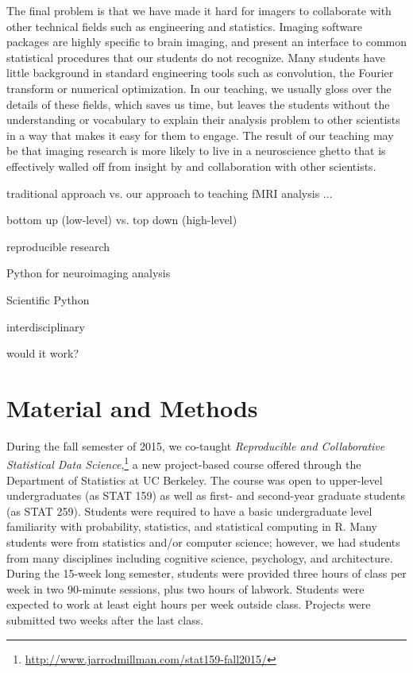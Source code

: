 The final problem is that we have made it hard for imagers to collaborate with
other technical fields such as engineering and statistics.  Imaging software
packages are highly specific to brain imaging, and present an interface to
common statistical procedures that our students do not recognize.  Many
students have little background in standard engineering tools such as
convolution, the Fourier transform or numerical optimization.  In our
teaching, we usually gloss over the details of these fields, which saves us
time, but leaves the students without the understanding or vocabulary to
explain their analysis problem to other scientists in a way that makes it easy
for them to engage.  The result of our teaching may be that imaging research
is more likely to live in a neuroscience ghetto that is effectively walled off
from insight by and collaboration with other scientists.


traditional approach vs. our approach to teaching fMRI analysis ...

bottom up (low-level) vs. top down (high-level)

reproducible research \citep{millman2014developing}

Python for neuroimaging analysis \citep{millman2007analysis}

Scientific Python \citep{millman2011python}

interdisciplinary

would it work?

\section{Material and Methods}

During the fall semester of 2015, we co-taught \emph{Reproducible and Collaborative
Statistical Data Science},\footnote{\url{http://www.jarrodmillman.com/stat159-fall2015/}}
a new project-based course offered through the Department of Statistics at UC Berkeley.
The course was open to upper-level undergraduates (as STAT 159) as well as
first- and second-year graduate students (as STAT 259).
Students were required to have a basic undergraduate level familiarity with
probability, statistics, and statistical computing in R.
Many students were from statistics and/or computer science; however, we had
students from many disciplines including cognitive science, psychology, and
architecture.
During the 15-week long semester, students were provided three hours of class
per week in two 90-minute sessions, plus two hours of labwork.
Students were expected to work at least eight hours per week outside class.
Projects were submitted two weeks after the last class.

